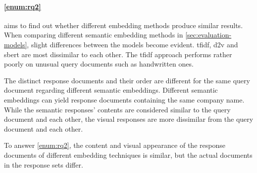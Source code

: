 \paragraph{\ref{enum:rq2}} aims to find out whether different embedding methods produce similar results.
When comparing different semantic embedding methods in \autoref{sec:evaluation-models}, 
slight differences between the models become evident.
\ac{tfidf}, \ac{d2v} and \ac{sbert} are most dissimilar to each other.
The \ac{tfidf} approach performs rather poorly on unusual query documents such as handwritten ones.

The distinct response documents and their order are different for the same query document regarding different semantic embeddings.
Different semantic embeddings can yield response documents containing the same company name.
While the semantic responses' contents are considered similar to the query document and each other,
the visual responses are more dissimilar from the query document and each other.


To answer \ref{enum:rq2}, the content and visual appearance of the response documents 
of different embedding techniques is similar,
but the actual documents in the response sets differ.
